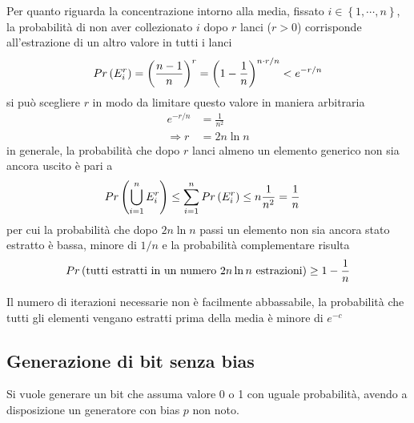 Per quanto riguarda la concentrazione intorno alla media, fissato $
i \in \left\{ 1, \cdots, n \right\}
$, la probabilità di non aver collezionato $i$ dopo $r$ lanci ($r>0$) 
corrisponde all'estrazione di un altro valore in tutti i lanci
\begin{equation*}
    Pr\left(
        E_i^r
    \right)
    =
    \left( \frac{n-1}{n} \right)^{r}
    =
    \left( 1- \frac{1}{n} \right)^{n \cdot
        r/n
    }
    <
    e^{-r/n}
\end{equation*}
si può scegliere $r$ in modo da limitare questo valore in maniera arbitraria
\begin{align*}
    e^{-r/n}
    &= 
    \frac{1}{n^2}
    \\
    \Rightarrow
    r &= 
    2 n \ln n 
\end{align*}
in generale, la probabilità che dopo $r$ lanci almeno un elemento generico non sia ancora uscito è pari a 
\begin{align*}
    Pr\left(
        \bigcup_{i=1}^{n}
        E_i^r
    \right)
    &
    \leq
    \sum_{i=1}^{n}
    Pr\left(
        E_i^r
    \right)
    \leq
    n \frac{1}{n^2}
    =
    \frac{1}{n}
\end{align*}
per cui la probabilità che dopo $
2 n \ln n 
$ passi un elemento non sia ancora stato estratto è bassa, minore di $
1/n
$ e la probabilità complementare risulta
\begin{align*}
    Pr\left(
        \text{tutti estratti in un numero $
            2 n \ln n 
        $ estrazioni}
    \right)
    \geq 1 - \frac{1}{n}
\end{align*}

Il numero di iterazioni necessarie non è facilmente abbassabile, la probabilità che tutti gli elementi vengano estratti prima della media è minore di $
e^{-c}
$

\subsection{Generazione di bit senza bias}

Si vuole generare un bit che assuma valore 0 o 1 con uguale probabilità, avendo a disposizione un generatore con bias $p$ non noto.

